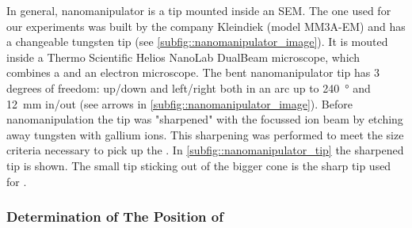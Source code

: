 	In general, nanomanipulator is a tip mounted inside an SEM.
	The one used for our experiments was built by the company Kleindiek (model MM3A-EM) and has a changeable tungsten tip (see \cref{subfig::nanomanipulator_image}).
	It is mouted inside a Thermo Scientific\texttrademark{} Helios NanoLab\texttrademark{}  DualBeam\texttrademark{} microscope, which combines a \fib and an electron microscope.
	The bent nanomanipulator tip has 3 degrees of freedom: up/down and left/right both in an arc up to \SI{240}{\degree} and \SI{12}{\milli\metre} in/out (see arrows in \cref{subfig::nanomanipulator_image}). 
	Before nanomanipulation the tip was "sharpened" with the focussed ion beam by etching away  tungsten with gallium ions.
	This sharpening was performed to meet the size criteria necessary to pick up the \nds.
	In \cref{subfig::nanomanipulator_tip} the sharpened tip is shown.
	The small tip sticking out of the bigger cone is the sharp tip used for \pp.


	\subsubsection{Determination of The Position of \Nds}

